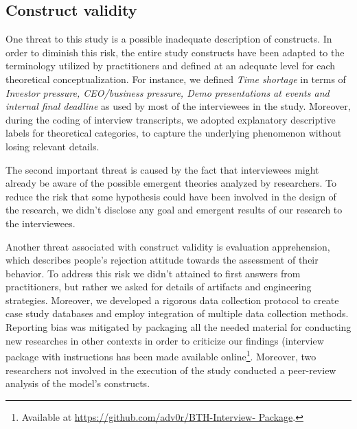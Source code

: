 \documentclass[10pt,journal,letterpaper,compsoc]{IEEEtran}
\begin{document}
\subsection{Construct validity} %
One threat to this study is a possible inadequate description of constructs. In 
order to diminish this risk, the entire study constructs have been adapted to  
the terminology utilized by practitioners and defined at an adequate level for  
each theoretical conceptualization. For instance, we defined \textit{Time  
shortage} in terms of \textit{Investor pressure, CEO/business  pressure, Demo 
presentations at events and internal final deadline} as used by  most of the 
interviewees in the study.
Moreover, during the coding of interview transcripts, we adopted explanatory
descriptive labels for theoretical categories, to capture the underlying
phenomenon without losing relevant details.

The second important threat is caused by the fact that interviewees might  
already be aware of the possible emergent theories analyzed by researchers. To  
reduce the risk that some hypothesis could have been involved in the design of  
the research, we didn't disclose any goal and emergent results of our research 
to the interviewees.

Another threat associated with construct validity is evaluation  apprehension,
which describes people's rejection attitude towards the  assessment of their
behavior.  To address this risk we didn't attained to first answers from
practitioners, but  rather we asked for details of artifacts and engineering
strategies. %
Moreover, we developed a rigorous data collection protocol to create case study 
databases and employ integration of multiple data collection methods.%
Reporting bias was mitigated by packaging all the needed  material for
conducting new researches in other contexts in order to criticize  our findings
(interview package with instructions has been made available
online\footnote{Available at  \url{https://github.com/adv0r/BTH-Interview-
Package}.}. %
Moreover, two researchers not involved in the execution of the study
conducted  a peer-review analysis of the model's constructs.
\end{document}

